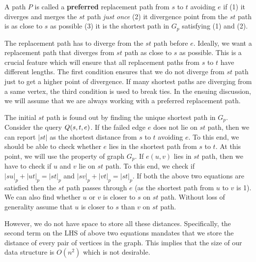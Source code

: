 \begin{definition}
A path $P$ is called a \textbf{preferred} replacement path from $s$ to $t$ avoiding $e$ if
(1)  it diverges and merges the $st$ path {\em just once}
(2)  it divergence point from the $st$ path is as close to $s$ as possible
(3)  it is the shortest path in $G_p$ satisfying (1) and (2).
\end{definition}


\noindent The replacement path has to diverge from the $st$ path before $e$. Ideally,
we want a replacement path that diverges from $st$ path as close to $s$ as possible.
This is a crucial feature which will ensure that all  replacement paths from
$s$ to  $t$ have  different lengths. The first condition ensures that we do
not diverge from $st$ path just to get a higher point of divergence. If many shortest paths are diverging from a same vertex, the third condition
is used to break ties. In the ensuing discussion, we will assume that  we are always working with a preferred replacement path.

\begin{comment}
 Fix a vertex $t$. In this paper, we will show
that the query
${\sc Q}(s,t,e)$ (for $s \in S, u \in V$) can be answered
in $\tilde O(1)$ using $\tilde O(\sqrt{\sigma n})$ space.
This immediately implies that we can answer exact queries
in $\tilde O(1)$ time using $\tilde O(\sigma^{1/2} n^{3/2})$
space. In the rest of the paper, we try to find a distance
oracle for a fixed $t$.
\end{comment}

The initial $st$ path is found out by finding the unique shortest path in $G_p$.
Consider the query
${\sc Q}(s,t,e)$. If the failed edge $e$ does not lie on $st$ path, then we can report $|st|$ as the shortest distance from $s$ to $t$ avoiding $e$. To this end, we should be able to check whether $e$ lies in the shortest path from $s$ to $t$. At this point, we will use the property of graph $G_p$. If $e(u,v)$ lies in $st$ path, then we have to check if $u$ and $v$ lie on $st$ path. To this end, we check if $|su|_p + |ut|_p = |st|_p$ and $|sv|_p + |vt|_p = |st|_p$.
If both the above two equations are satisfied then the $st$ path passes through $e$ (as the shortest path from $u$ to $v$ is 1). We can also find whether $u$ or $v$ is closer to  $s$ on $st$ path. Without loss of generality assume that $u$ is closer to $s$ than $v$ on $st$ path.

However, we do not have space to store all these distances. Specifically, the second term on the LHS of  above two equations mandates that we store the distance of every pair of vertices in the graph. This implies that the size of our data structure is
$O(n^2)$ which is not desirable.


